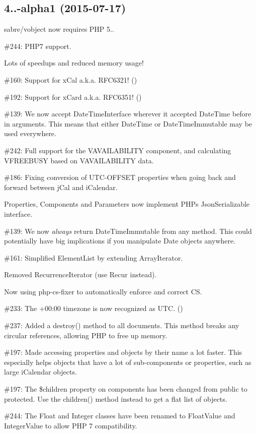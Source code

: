 \subsection*{4..-\/alpha1 (2015-\/07-\/17) }


\begin{DoxyItemize}
\item sabre/vobject now requires P\+HP 5..
\item \#244\+: P\+H\+P7 support.
\item Lots of speedups and reduced memory usage!
\item \#160\+: Support for x\+Cal a.\+k.\+a. R\+F\+C6321! ()
\item \#192\+: Support for x\+Card a.\+k.\+a. R\+F\+C6351! ()
\item \#139\+: We now accept {\ttfamily Date\+Time\+Interface} wherever it accepted {\ttfamily Date\+Time} before in arguments. This means that either {\ttfamily Date\+Time} or {\ttfamily Date\+Time\+Immutable} may be used everywhere.
\item \#242\+: Full support for the {\ttfamily V\+A\+V\+A\+I\+L\+A\+B\+I\+L\+I\+TY} component, and calculating {\ttfamily V\+F\+R\+E\+E\+B\+U\+SY} based on {\ttfamily V\+A\+V\+A\+I\+L\+A\+B\+I\+L\+I\+TY} data.
\item \#186\+: Fixing conversion of {\ttfamily U\+T\+C-\/\+O\+F\+F\+S\+ET} properties when going back and forward between j\+Cal and i\+Calendar.
\item Properties, Components and Parameters now implement P\+HP\textquotesingle{}s {\ttfamily Json\+Serializable} interface.
\item \#139\+: We now {\itshape always} return {\ttfamily Date\+Time\+Immutable} from any method. This could potentially have big implications if you manipulate Date objects anywhere.
\item \#161\+: Simplified {\ttfamily Element\+List} by extending {\ttfamily Array\+Iterator}.
\item Removed {\ttfamily Recurrence\+Iterator} (use Recur instead).
\item Now using php-\/cs-\/fixer to automatically enforce and correct CS.
\item \#233\+: The {\ttfamily +00\+:00} timezone is now recognized as U\+TC. ()
\item \#237\+: Added a {\ttfamily destroy()} method to all documents. This method breaks any circular references, allowing P\+HP to free up memory.
\item \#197\+: Made accessing properties and objects by their name a lot faster. This especially helps objects that have a lot of sub-\/components or properties, such as large i\+Calendar objects.
\item \#197\+: The {\ttfamily \$children} property on components has been changed from {\ttfamily public} to {\ttfamily protected}. Use the {\ttfamily children()} method instead to get a flat list of objects.
\item \#244\+: The {\ttfamily Float} and {\ttfamily Integer} classes have been renamed to {\ttfamily Float\+Value} and {\ttfamily Integer\+Value} to allow P\+HP 7 compatibility.
\end{DoxyItemize}

